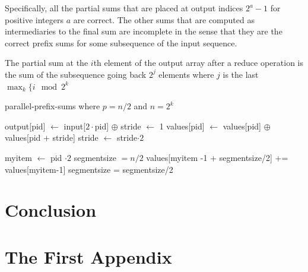 \documentclass[12pt,twoside]{reedthesis}
\begin{document}

Specifically, all the partial sums that are placed at output indices $2^a-1$ for positive integers $a$ are correct. The other sums that are computed as intermediaries to the final sum are incomplete in the sense that they are the correct prefix sums for some subsequence of the input sequence.

The partial sum at the $i$th element of the output array  after a reduce operation is the sum of the subsequence going back $2^j$ elements where $j$ is the last   $\max_k \{ i \mod 2^k $

\begin{algorithm}[h!]
\caption{parallel-prefix-sums where $p = n/2$ and $n=2^k$}
\begin{algorithmic}
\STATE output[pid] $\leftarrow$ input[$2\cdot \mbox{pid}$] $\oplus$
\STATE stride $\leftarrow$ 1
\STATE values[pid] $\leftarrow$ values[pid] $\oplus$ values[pid $+$ stride] 
\STATE stride $\leftarrow$ stride$\cdot 2$
\ENDWHILE
\RETURN

\STATE myitem $\leftarrow$ pid $\cdot 2$ 
\STATE segmentsize $= n/2$
\STATE values[myitem -1 + segmentsize/2] += values[myitem-1]
\ENDIF
\STATE segmentsize = segmentsize/2

\ENDWHILE
\end{algorithmic}
\end{algorithm}
	
\chapter*{Conclusion}
	\setcounter{chapter}{4}
	\setcounter{section}{0}
	

    \appendix
      \chapter{The First Appendix}



  \backmatter 

    \nocite{*}
    
\end{document}
